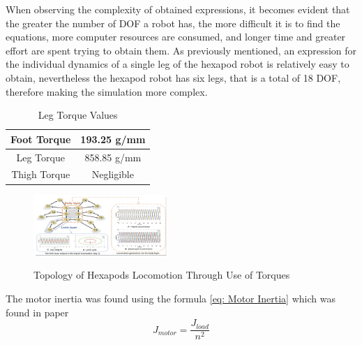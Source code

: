 When observing the complexity of obtained expressions, it becomes evident that the greater the number of DOF a robot has, the more difficult it is to find the equations, more computer resources are consumed, and longer time and greater effort are spent trying to obtain them. As previously mentioned, an expression for the individual dynamics of a single leg of the hexapod robot is relatively easy to obtain, nevertheless the hexapod robot has six legs, that is a total of 18 DOF, therefore making the simulation more complex.\\




\begin{table}[htbp]
	\caption{Leg Torque Values}
	\begin{center}
		\begin{tabular}{|c|c|}
			\hline  
			Foot Torque & 193.25 g/mm \\
			\hline
			Leg Torque & 858.85 g/mm\\
			\hline
			Thigh Torque & Negligible \\
			\hline
		\end{tabular}
		\end{center}
	\label{tab3}
	
\end{table}






\begin{figure}[h]
 \centering
   \includegraphics[width = 0.45\textwidth]{figures/13.png}                            
   \caption{Topology of Hexapods Locomotion Through Use of Torques}
   \cite{10.3389/fnbot.2021.627157}
   \label{fig: Diagram 5}
\end{figure}




The motor inertia was found using the formula \ref{eq: Motor Inertia} which was found in paper \cite{LYNCH2016427}
\begin{equation} \label{eq: Motor Inertia}
	J_{motor} = \frac{J_{load}}{n^2}
\end{equation}

	


